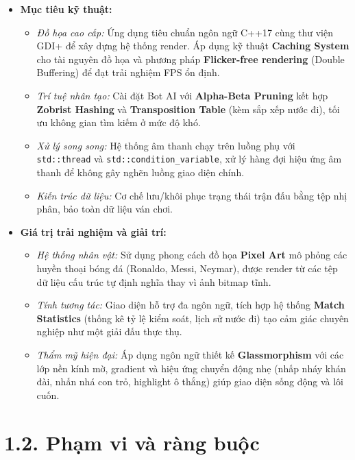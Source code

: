 \begin{itemize}
    \item \textbf{Mục tiêu kỹ thuật:}
    \begin{itemize}
        \item \textit{Đồ họa cao cấp:} Ứng dụng tiêu chuẩn ngôn ngữ C++17 cùng thư viện GDI+ để xây dựng hệ thống render. Áp dụng kỹ thuật \textbf{Caching System} cho tài nguyên đồ họa và phương pháp \textbf{Flicker-free rendering} (Double Buffering) để đạt trải nghiệm FPS ổn định.
        \item \textit{Trí tuệ nhân tạo:} Cài đặt Bot AI với \textbf{Alpha-Beta Pruning} kết hợp \textbf{Zobrist Hashing} và \textbf{Transposition Table} (kèm sắp xếp nước đi), tối ưu không gian tìm kiếm ở mức độ khó.
        \item \textit{Xử lý song song:} Hệ thống âm thanh chạy trên luồng phụ với \texttt{std::thread} và \texttt{std::condition\_variable}, xử lý hàng đợi hiệu ứng âm thanh để không gây nghẽn luồng giao diện chính.
        \item \textit{Kiến trúc dữ liệu:} Cơ chế lưu/khôi phục trạng thái trận đấu bằng tệp nhị phân, bảo toàn dữ liệu ván chơi.
    \end{itemize}

    \item \textbf{Giá trị trải nghiệm và giải trí:}
    \begin{itemize}
        \item \textit{Hệ thống nhân vật:} Sử dụng phong cách đồ họa \textbf{Pixel Art} mô phỏng các huyền thoại bóng đá (Ronaldo, Messi, Neymar), được render từ các tệp dữ liệu cấu trúc tự định nghĩa thay vì ảnh bitmap tĩnh.
        \item \textit{Tính tương tác:} Giao diện hỗ trợ đa ngôn ngữ, tích hợp hệ thống \textbf{Match Statistics} (thống kê tỷ lệ kiểm soát, lịch sử nước đi) tạo cảm giác chuyên nghiệp như một giải đấu thực thụ.
        \item \textit{Thẩm mỹ hiện đại:} Áp dụng ngôn ngữ thiết kế \textbf{Glassmorphism} với các lớp nền kính mờ, gradient và hiệu ứng chuyển động nhẹ (nhấp nháy khán đài, nhấn nhá con trỏ, highlight ô thắng) giúp giao diện sống động và lôi cuốn.
    \end{itemize}
\end{itemize}


\section*{1.2. Phạm vi và ràng buộc}

